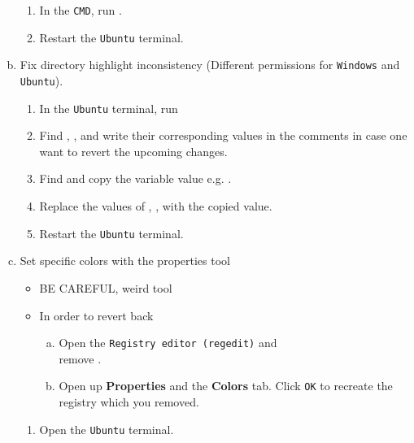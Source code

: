 \begin{enumerate}[a)]
\begin{enumerate}[1.]
        \item In the \texttt{CMD}, run .
        
        \item Restart the \texttt{Ubuntu} terminal.
    \end{enumerate}
    
    \item Fix directory highlight inconsistency (Different permissions for \texttt{Windows} and \texttt{Ubuntu}).
    \begin{enumerate}[1.]
        \item In the \texttt{Ubuntu} terminal, run 
        
        \item Find , ,  and write their corresponding values in the comments in case one want to revert the upcoming changes.
        
        \item Find  and copy the variable value e.g. .
        
        \item Replace the values of , ,  with the copied value.
        
        \item Restart the \texttt{Ubuntu} terminal.
    \end{enumerate}
    
    \item Set specific colors with the properties tool
    \begin{itemize}
        \item BE CAREFUL, weird tool
        
        \item In order to revert back
        \begin{enumerate}[a)]
            \item Open the \texttt{Registry editor (regedit)} and\\remove {}.
            
            \item Open up \textbf{Properties} and the \textbf{Colors} tab. Click \texttt{OK} to recreate the registry which you removed.
        \end{enumerate}
    \end{itemize}
    \begin{enumerate}[1.]
        \item Open the \texttt{Ubuntu} terminal.
        

\end{enumerate}
\end{enumerate}

